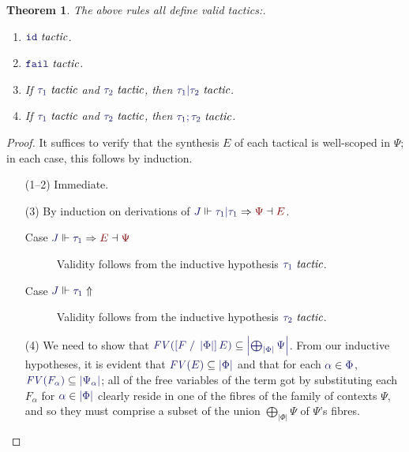 \documentclass[11pt]{amsart}
\newtheorem{thm}{Theorem}[section]
\theoremstyle{definition}
\theoremstyle{remark}
\numberwithin{equation}{section}
\def\InputModeColorName{MidnightBlue}
\def\OutputModeColorName{Maroon}
\newcommand\InputMode[1]{{\color{\InputModeColorName}{#1}}}
\newcommand\OutputMode[1]{{\color{\OutputModeColorName}{#1}}}
\newcommand\JJ{J}
\newcommand\IsTac[1]{\InputMode{#1}\ \textit{tactic}}
\newcommand\Refine[4]{\InputMode{#1}\Vdash\InputMode{#2}\Rightarrow\OutputMode{#4}\dashv\OutputMode{#3}}
\newcommand\NoRefine[2]{\InputMode{#1}\Vdash\InputMode{#2}\Uparrow}
\newcommand\Member[2]{\InputMode{#1}\in\InputMode{#2}}
\newcommand\IdTac{\mathtt{id}}
\newcommand\FailTac{\mathtt{fail}}
\newcommand\OrElseTac[2]{#1\vert#2}
\newcommand\ThenTac[2]{#1;#2}
\newcommand\Dom[1]{\left\vert#1\right\vert}
\newcommand\SubsetEq[2]{\InputMode{#1}\subseteq\InputMode{#2}}
\newcommand\FV[1]{\textit{FV}\left(#1\right)}
\newcommand\Subst[3]{\left[#1\;/\;#2\right]#3}
\begin{document}
\begin{thm}
  The above rules all define valid tactics:.
  \begin{enumerate}
    \item $\IsTac{\IdTac}$.
    \item $\IsTac{\FailTac}$.
    \item If $\IsTac{\tau_1}$ and $\IsTac{\tau_2}$, then
      $\IsTac{\OrElseTac{\tau_1}{\tau_2}}$.
    \item If $\IsTac{\tau_1}$ and $\IsTac{\tau_2}$, then
      $\IsTac{\ThenTac{\tau_1}{\tau_2}}$.
  \end{enumerate}
\end{thm}
\begin{proof}
  It suffices to verify that the synthesis $E$ of each tactical is well-scoped
  in $\Psi$; in each case, this follows by induction.
  \begin{enumerate}
    \item[(1--2)] Immediate.
    \item[(3)]
      By induction on derivations of
      $\Refine{\JJ}{\OrElseTac{\tau_1}{\tau_1}}{E}{\Psi}$.
      \begin{description}
        \item[Case $\Refine{\JJ}{\tau_1}{\Psi}{E}$] Validity follows from the
          inductive hypothesis $\IsTac{\tau_1}$.
        \item[Case $\NoRefine{\JJ}{\tau_1}$] Validity follows from the
          inductive hypothesis $\IsTac{\tau_2}$.
      \end{description}

    \item[(4)] We need to show that
      $\SubsetEq{\FV{\Subst{F}{\Dom\Phi}{E}}}{\Dom{\bigoplus_{\Dom\Phi}\Psi}}$.
      From our inductive hypotheses, it is evident that
      $\SubsetEq{\FV{E}}{\Dom\Phi}$ and that for each $\Member{\alpha}{\Phi}$,
      $\SubsetEq{\FV{F_\alpha}}{\Dom{\Psi_\alpha}}$; all of the free variables
      of the term got by substituting each $F_\alpha$ for
      $\Member{\alpha}{\Dom\Phi}$ clearly reside in one of the fibres of the
      family of contexts $\Psi$, and so they must comprise a subset of the
      union $\bigoplus_{\Dom\Phi}\Psi$ of $\Psi$'s fibres.

  \end{enumerate}
\end{proof}
\end{document}
